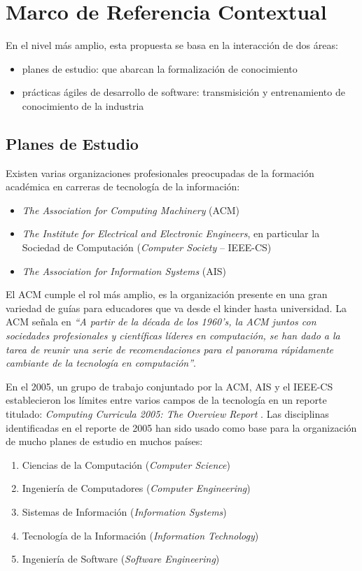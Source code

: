 \section{Marco de Referencia Contextual}
En el nivel más amplio, esta propuesta se basa en la interacción de dos áreas:
\begin{itemize}
    \item planes de estudio: que abarcan la formalización de conocimiento
    \item prácticas ágiles de desarrollo de software: transmisición y entrenamiento de conocimiento de la industria
\end{itemize}

\subsection{Planes de Estudio} \label{sec:ch1-planes-estudio}
Existen varias organizaciones profesionales preocupadas de la formación académica en carreras de tecnología de la información:
\begin{itemize}
    \item \emph{The Association for Computing Machinery} (ACM)
    \item \emph{The Institute for Electrical and Electronic Engineers}, en particular la Sociedad de Computación (\emph{Computer Society} -- IEEE-CS)
    \item \emph{The Association for Information Systems} (AIS)
\end{itemize}

El ACM cumple el rol más amplio, es la organización presente en una gran variedad de guías para educadores que va desde el kinder hasta universidad. La ACM señala en \cite{acm-curriculum} \emph{``A partir de la década de los 1960's, la ACM juntos con sociedades profesionales y científicas líderes en computación, se han dado a la tarea de reunir una serie de recomendaciones para el panorama rápidamente cambiante de la tecnología en computación''}.

En el 2005, un grupo de trabajo conjuntado por la ACM, AIS y el IEEE-CS establecieron los límites entre varios campos de la tecnología en un reporte titulado: \emph{Computing Curricula 2005: The Overview Report} \cite{shackelford-et-al}. Las disciplinas identificadas en el reporte de 2005 han sido usado como base para la organización de mucho planes de estudio en muchos países:
\begin{enumerate}
    \item Ciencias de la Computación (\emph{Computer Science}) \label{item:cs}
    \item Ingeniería de Computadores (\emph{Computer Engineering}) \label{item:ce}
    \item Sistemas de Información (\emph{Information Systems}) \label{item:is}
    \item Tecnología de la Información (\emph{Information Technology}) \label{item:it}
    \item Ingeniería de Software (\emph{Software Engineering}) \label{item:se}
\end{enumerate}

